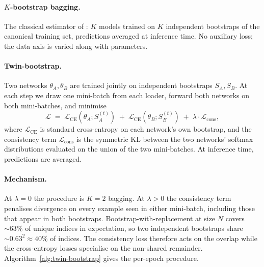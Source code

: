 \paragraph{\boldmath$K$-bootstrap bagging.}
The classical estimator of \citet{Breiman1996}: $K$ models
trained on $K$ independent bootstraps of the canonical training set,
predictions averaged at inference time.  No auxiliary loss; the data
axis is varied along with parameters.

\paragraph{Twin-bootstrap.}
Two networks $\theta_A, \theta_B$ are trained jointly on independent
bootstraps $S_A, S_B$.  At each step we draw one mini-batch from each
loader, forward both networks on both mini-batches, and minimise
\begin{equation}
  \mathcal{L} \;=\;
    \mathcal{L}_{\mathrm{CE}}(\theta_A; S_A^{(t)}) \;+\;
    \mathcal{L}_{\mathrm{CE}}(\theta_B; S_B^{(t)}) \;+\;
    \lambda \cdot \mathcal{L}_{\mathrm{cons}},
\end{equation}
where $\mathcal{L}_{\mathrm{CE}}$ is standard cross-entropy on each
network's own bootstrap, and the consistency term
$\mathcal{L}_{\mathrm{cons}}$ is the symmetric KL between the two
networks' softmax distributions evaluated on the union of the two
mini-batches.  At inference time, predictions are averaged.

\paragraph{Mechanism.}
At $\lambda{=}0$ the procedure is $K{=}2$ bagging.  At $\lambda > 0$
the consistency term penalises divergence on every example seen in
either mini-batch, including those that appear in both bootstraps.
Bootstrap-with-replacement at size $N$ covers ${\sim}63\%$ of unique
indices in expectation, so two independent bootstraps share
${\sim}0.63^2 \approx 40\%$ of indices.  The consistency loss
therefore acts on the overlap while the cross-entropy losses
specialise on the non-shared remainder.  
Algorithm~\ref{alg:twin-bootstrap} gives the per-epoch
procedure.

